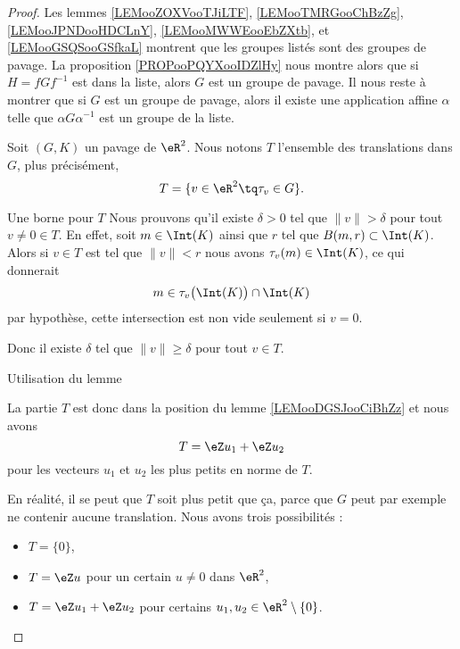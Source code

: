 \begin{proof}
	Les lemmes \ref{LEMooZOXVooTJiLTF},    \ref{LEMooTMRGooChBzZg},    \ref{LEMooJPNDooHDCLnY},    \ref{LEMooMWWEooEbZXtb}, et    \ref{LEMooGSQSooGSfkaL} montrent que les groupes listés sont des groupes de pavage. La proposition \ref{PROPooPQYXooIDZlHy} nous montre alors que si \( H=f Gf^{-1}\) est dans la liste, alors \( G\) est un groupe de pavage. Il nous reste à montrer que si \( G\) est un groupe de pavage, alors il existe une application affine \( \alpha\) telle que \( \alpha G\alpha^{-1}\) est un groupe de la liste.

	Soit \( (G,K)\) un pavage de \( \eR^2\).  Nous notons \( T\) l'ensemble des translations dans \( G\), plus précisément,
	\begin{equation}
		T=\{ v\in \eR^2\tq  \tau_v\in G\}.
	\end{equation}
	\begin{subproof}
		\item[Une borne pour \( T\)]
		Nous prouvons qu'il existe \( \delta>0\) tel que \( \| v \|>\delta\) pour tout \( v\neq 0\in T\). En effet, soit \( m\in \Int(K)\) ainsi que \( r\) tel que \( B(m,r)\subset \Int(K)\). Alors si \( v\in T\) est tel que \( \| v \|<r\) nous avons \( \tau_v(m)\in \Int(K)\), ce qui donnerait
		\begin{equation}
			m\in\tau_v\big( \Int(K) \big)\cap\Int(K)
		\end{equation}
		par hypothèse, cette intersection est non vide seulement si \( v=0\).

		Donc il existe \( \delta\) tel que \( \| v \|\geq \delta\) pour tout \( v\in T\).
		\item[Utilisation du lemme]

		La partie \( T\) est donc dans la position du lemme \ref{LEMooDGSJooCiBhZz} et nous avons
		\begin{equation}
			T=\eZ u_1+\eZ u_2
		\end{equation}
		pour les vecteurs \( u_1\) et \( u_2\) les plus petits en norme de \( T\).

		En réalité, il se peut que \( T\) soit plus petit que ça, parce que \( G\) peut par exemple ne contenir aucune translation. Nous avons trois possibilités :
		\begin{itemize}
			\item \( T=\{ 0 \}\),
			\item \( T=\eZ u\) pour un certain \( u\neq 0\) dans \( \eR^2\),
			\item \( T=\eZ u_1+\eZ u_2\) pour certains \( u_1,u_2\in \eR^2\setminus\{ 0 \}\).
		\end{itemize}


\end{subproof}
\end{proof}
